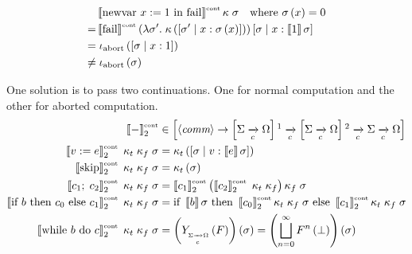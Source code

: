 \begin{enumcirc}
\begin{align*}
		     & \left\llbracket \textrm{newvar } x := 1 \textrm{ in } \textrm{fail} \right\rrbracket^{\textrm{\tiny cont}}\kappa\;\sigma
		\quad \textrm{where } \sigma\left( x \right) = 0                              \\
		=    & \left\llbracket \textrm{fail} \right\rrbracket^{\textrm{\tiny cont}}
		\left( \lambda \sigma^\prime.\; \kappa\left( \left[ \sigma^\prime \; \middle\vert \; x:\sigma\left( x \right) \right] \right) \right)
		\left[ \sigma \; \middle\vert \; x: \left\llbracket 1 \right\rrbracket{\sigma} \right]                                 \\
		=    & \; \iota_{\textrm{abort}}\left( \left[ \sigma \; \middle\vert \; x:1 \right] \right)                             \\
		\neq & \; \iota_{\textrm{abort}}\left( \sigma \right)                                        \\
	\end{align*}
	\item
	One solution is to pass two continuations.
	One for normal computation and the other for aborted computation.
	\begin{align*}
		\supsctext{\bbrackets{-}}{cont}_2                                             &
		\in \brackets{
			\chevrons{\textit{comm}} \to
			\brackets{\Sigma \toc \Omega}\footnotemark \toc
			\brackets{\Sigma \toc \Omega}\footnotemark \toc
			\Sigma \toc \Omega
		}                                                                                         \\
		\supsctext{\bbrackets{\cassign{v}{e}}}{cont}_2\;\kappa_t\;\kappa_f\;\sigma    &
		= \kappa_t\prths{\aug{\sigma}{v:\bbrackets{e}\sigma}}                                     \\
		\supsctext{\bbrackets{\cskip}}{cont}_2\;\kappa_t\;\kappa_f\;\sigma            &
		= \kappa_t\prths{\sigma}                                                                  \\
		\supsctext{\bbrackets{\cseq{c_1}{c_2}}}{cont}_2\;\kappa_t\;\kappa_f\;\sigma   &
		= \supsctext{\bbrackets{c_1}}{cont}_2
		\prths{\supsctext{\bbrackets{c_2}}{cont}_2\;\kappa_t\;\kappa_f}\kappa_f\;\sigma           \\
		\supsctext{\bbrackets{\cif{b}{c_0}{c_1}}}{cont}_2\;\kappa_t\;\kappa_f\;\sigma &
		= \cif{\bbrackets{b}\sigma}
		{\supsctext{\bbrackets{c_0}}{cont}_2\kappa_t\;\kappa_f\;\sigma}
		{\supsctext{\bbrackets{c_1}}{cont}_2\kappa_t\;\kappa_f\;\sigma}                           \\
		\supsctext{\bbrackets{\cwhile{b}{c}}}{cont}_2\;\kappa_t\;\kappa_f\;\sigma     &
		= \prths{\subscmath{Y}{\Sigma \toc \Omega} \prths{F}} \prths{\sigma}
		= \prths{\bigsqcup_{n=0}^\infty F^n\prths{\bot}}\prths{\sigma}                            \\

\end{align*}
\end{enumcirc}
